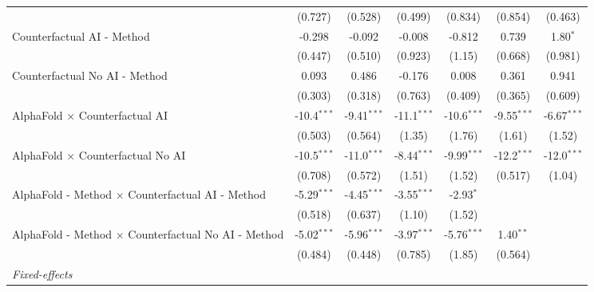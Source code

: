 \begin{tabular}{lcccccc}
                                                              & (0.727)       & (0.528)       & (0.499)       & (0.834)       & (0.854)       & (0.463)\\   
   Counterfactual AI - Method                                 & -0.298        & -0.092        & -0.008        & -0.812        & 0.739         & 1.80$^{*}$\\   
                                                              & (0.447)       & (0.510)       & (0.923)       & (1.15)        & (0.668)       & (0.981)\\   
   Counterfactual No AI - Method                              & 0.093         & 0.486         & -0.176        & 0.008         & 0.361         & 0.941\\   
                                                              & (0.303)       & (0.318)       & (0.763)       & (0.409)       & (0.365)       & (0.609)\\   
   AlphaFold $\times$ Counterfactual AI                       & -10.4$^{***}$ & -9.41$^{***}$ & -11.1$^{***}$ & -10.6$^{***}$ & -9.55$^{***}$ & -6.67$^{***}$\\   
                                                              & (0.503)       & (0.564)       & (1.35)        & (1.76)        & (1.61)        & (1.52)\\   
   AlphaFold $\times$ Counterfactual No AI                    & -10.5$^{***}$ & -11.0$^{***}$ & -8.44$^{***}$ & -9.99$^{***}$ & -12.2$^{***}$ & -12.0$^{***}$\\   
                                                              & (0.708)       & (0.572)       & (1.51)        & (1.52)        & (0.517)       & (1.04)\\   
   AlphaFold - Method $\times$ Counterfactual AI - Method     & -5.29$^{***}$ & -4.45$^{***}$ & -3.55$^{***}$ & -2.93$^{*}$   &               &   \\   
                                                              & (0.518)       & (0.637)       & (1.10)        & (1.52)        &               &   \\   
   AlphaFold - Method $\times$ Counterfactual No AI - Method  & -5.02$^{***}$ & -5.96$^{***}$ & -3.97$^{***}$ & -5.76$^{***}$ & 1.40$^{**}$   &   \\   
                                                              & (0.484)       & (0.448)       & (0.785)       & (1.85)        & (0.564)       &   \\   
   \midrule
   \emph{Fixed-effects}\\

\end{tabular}
